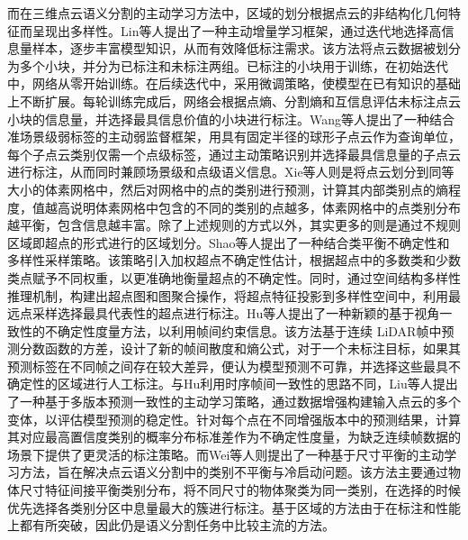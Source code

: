 而在三维点云语义分割的主动学习方法中，区域的划分根据点云的非结构化几何特征而呈现出多样性。Lin等人提出了一种主动增量学习框架，通过迭代地选择高信息量样本，逐步丰富模型知识，从而有效降低标注需求。该方法将点云数据被划分为多个小块，并分为已标注和未标注两组。已标注的小块用于训练，在初始迭代中，网络从零开始训练。在后续迭代中，采用微调策略，使模型在已有知识的基础上不断扩展。每轮训练完成后，网络会根据点熵、分割熵和互信息评估未标注点云小块的信息量，并选择最具信息价值的小块进行标注。Wang等人提出了一种结合准场景级弱标签的主动弱监督框架，用具有固定半径的球形子点云作为查询单位，每个子点云类别仅需一个点级标签，通过主动策略识别并选择最具信息量的子点云进行标注，从而同时兼顾场景级和点级语义信息。Xie等人则是将点云划分到同等大小的体素网格中，然后对网格中的点的类别进行预测，计算其内部类别点的熵程度，值越高说明体素网格中包含的不同的类别的点越多，体素网格中的点类别分布越平衡，包含信息越丰富。除了上述规则的方式以外，其实更多的则是通过不规则区域即超点的形式进行的区域划分。Shao等人提出了一种结合类平衡不确定性和多样性采样策略。该策略引入加权超点不确定性估计，根据超点中的多数类和少数类点赋予不同权重，以更准确地衡量超点的不确定性。同时，通过空间结构多样性推理机制，构建出超点图和图聚合操作，将超点特征投影到多样性空间中，利用最远点采样选择最具代表性的超点进行标注。Hu等人提出了一种新颖的基于视角一致性的不确定性度量方法，以利用帧间约束信息。该方法基于连续 LiDAR帧中预测分数函数的方差，设计了新的帧间散度和熵公式，对于一个未标注目标，如果其预测标签在不同帧之间存在较大差异，便认为模型预测不可靠，并选择这些最具不确定性的区域进行人工标注。与Hu利用时序帧间一致性的思路不同，Liu等人提出了一种基于多版本预测一致性的主动学习策略，通过数据增强构建输入点云的多个变体，以评估模型预测的稳定性。针对每个点在不同增强版本中的预测结果，计算其对应最高置信度类别的概率分布标准差作为不确定性度量，为缺乏连续帧数据的场景下提供了更灵活的标注策略。而Wei等人则提出了一种基于尺寸平衡的主动学习方法，旨在解决点云语义分割中的类别不平衡与冷启动问题。该方法主要通过物体尺寸特征间接平衡类别分布，将不同尺寸的物体聚类为同一类别，在选择的时候优先选择各类别分区中息量最大的簇进行标注。基于区域的方法由于在标注和性能上都有所突破，因此仍是语义分割任务中比较主流的方法。
